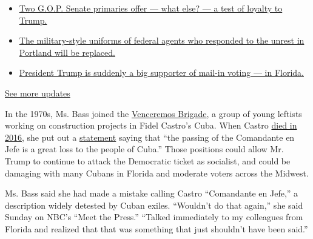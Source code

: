 \begin{itemize}
\tightlist
\item
  \href{https://www.nytimes3xbfgragh.onion/2020/08/04/us/elections/primary-election-michigan-arizona-kansas.html?action=click\&pgtype=Article\&state=default\&region=MAIN_CONTENT_1\&context=storylines_live_updates\#link-3924dd44}{Two
  G.O.P. Senate primaries offer --- what else? --- a test of loyalty to
  Trump.}
\item
  \href{https://www.nytimes3xbfgragh.onion/2020/08/04/us/elections/primary-election-michigan-arizona-kansas.html?action=click\&pgtype=Article\&state=default\&region=MAIN_CONTENT_1\&context=storylines_live_updates\#link-62a8e06b}{The
  military-style uniforms of federal agents who responded to the unrest
  in Portland will be replaced.}
\item
  \href{https://www.nytimes3xbfgragh.onion/2020/08/04/us/elections/primary-election-michigan-arizona-kansas.html?action=click\&pgtype=Article\&state=default\&region=MAIN_CONTENT_1\&context=storylines_live_updates\#link-32b39e33}{President
  Trump is suddenly a big supporter of mail-in voting --- in Florida.}
\end{itemize}

\href{https://www.nytimes3xbfgragh.onion/2020/08/04/us/elections/primary-election-michigan-arizona-kansas.html?action=click\&pgtype=Article\&state=default\&region=MAIN_CONTENT_1\&context=storylines_live_updates}{See
more updates}

In the 1970s, Ms. Bass joined the
\href{https://www.theatlantic.com/politics/archive/2020/07/karen-bass-cuba-venceremos-brigade/614662/}{Venceremos
Brigade}, a group of young leftists working on construction projects in
Fidel Castro's Cuba. When Castro
\href{https://www.nytimes3xbfgragh.onion/2016/11/26/world/americas/fidel-castro-dies.html}{died
in 2016}, she put out a
\href{https://bass.house.gov/media-center/press-releases/rep-bass-statement-passing-fidel-castro}{statement}
saying that ``the passing of the Comandante en Jefe is a great loss to
the people of Cuba.'' Those positions could allow Mr. Trump to continue
to attack the Democratic ticket as socialist, and could be damaging with
many Cubans in Florida and moderate voters across the Midwest.

Ms. Bass said she had made a mistake calling Castro ``Comandante en
Jefe,'' a description widely detested by Cuban exiles. ``Wouldn't do
that again,'' she said Sunday on NBC's ``Meet the Press.'' ``Talked
immediately to my colleagues from Florida and realized that that was
something that just shouldn't have been said.''

